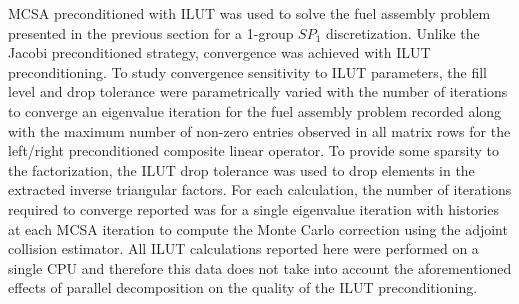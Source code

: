 MCSA preconditioned with ILUT was used to solve the fuel assembly
problem presented in the previous section for a 1-group $SP_1$
discretization. Unlike the Jacobi preconditioned strategy, convergence
was achieved with ILUT preconditioning. To study convergence
sensitivity to ILUT parameters, the fill level and drop tolerance were
parametrically varied with the number of iterations to converge an
eigenvalue iteration for the fuel assembly problem recorded along with
the maximum number of non-zero entries observed in all matrix rows for
the left/right preconditioned composite linear operator. To provide
some sparsity to the factorization, the ILUT drop tolerance was used
to drop elements in the extracted inverse triangular factors. For each
calculation, the number of iterations required to converge reported
was for a single eigenvalue iteration with  histories at each
MCSA iteration to compute the Monte Carlo correction using the adjoint
collision estimator. All ILUT calculations reported here were
performed on a single CPU and therefore this data does not take into
account the aforementioned effects of parallel decomposition on the
quality of the ILUT preconditioning.

